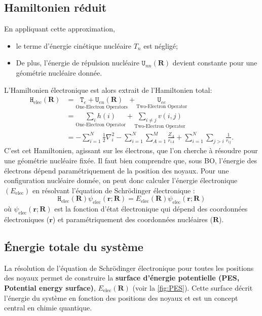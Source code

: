 \documentclass[12pt,a4paper]{article} %
\numberwithin{equation}{section} %
\numberwithin{figure}{section} %
\numberwithin{table}{section} %
\begin{document}
\subsection{Hamiltonien réduit}

En appliquant cette approximation,
\begin{itemize}
\item le terme d'énergie cinétique nucléaire $T_n$ est négligé; 
\item De plus, l'énergie de répulsion nucléaire $\mathtt{U}_{nn}(\mathbf{R})$ devient constante pour une géométrie nucléaire donnée.
\end{itemize}  
L'Hamiltonien électronique est alors extrait de l'Hamiltonien total:
\begin{equation}
\begin{split}
\mathtt{H}_{\text{elec}}(\mathbf{R}) &= \underset{\text{One-Electron Operators}}{\mathtt{T}_e + \mathtt{U}_{en}(\mathbf{R})} + \underset{\text{Two-Electron Operator}}{\mathtt{U}_{ee}}\\
&= \underset{\text{One-Electron Operator}}{\sum_i h(i)} + \underset{\text{Two-Electron Operator}}{\sum_{i\ne j}v(i, j)}\\
&=-\sum_{i=1}^N \frac12 \nabla_i^2 - \sum_{i=1}^N \sum_{A=1}^M \frac{Z_A}{r_{iA}} + \sum_{i=1}^N \sum_{j>i} \frac{1}{r_{ij}} .
\end{split}
\end{equation}
C'est cet Hamiltonien, agissant sur les électrons, que l'on cherche à résoudre pour une géométrie nucléaire fixée. Il faut bien comprendre que, sous BO, l'énergie des électrons dépend paramétriquement de la position des noyaux. Pour une configuration nucléaire donnée, on peut donc calculer l'énergie électronique $(E_{\text{elec}})$ en résolvant l'équation de Schrödinger électronique :
\begin{equation}
\mathtt{H}_{\text{elec}}(\mathbf{R}) \psi_{\text{elec}}(\mathbf{r}; \mathbf{R}) = E_{\text{elec}}(\mathbf{R}) \psi_{\text{elec}}(\mathbf{r}; \mathbf{R})
\end{equation}
où $\psi_{\text{elec}}(\mathbf{r}; \mathbf{R})$ est la fonction d'état électronique qui dépend des coordonnées électroniques ($\mathbf{r}$) et paramétriquement des coordonnées nucléaires ($\mathbf{R}$).

\subsection{Énergie totale du système}

La résolution de l'équation de Schrödinger électronique pour toutes les positions des noyaux permet de construire la \textbf{surface d'énergie potentielle (PES, 
Potential energy surface)}, $E_{\text{elec}}(\mathbf{R})$ (voir la \autoref{fig:PES}). Cette surface décrit l'énergie du système en fonction des positions des 
noyaux et est un concept central en chimie quantique.
\end{document}
